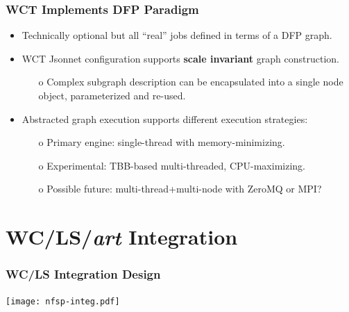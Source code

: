 \documentclass[xcolor=dvipsnames]{beamer}
\begin{document}
\begin{frame}
  \frametitle{WCT Implements DFP Paradigm}
  \begin{itemize}\footnotesize
  \item Technically optional but all ``real'' jobs defined in terms of a DFP graph.
  \item WCT Jsonnet configuration supports \textbf{scale invariant} graph construction.
    \begin{itemize}\scriptsize
    \item[o] Complex subgraph description can be encapsulated into a single node object, parameterized and re-used.
    \end{itemize}

  \item Abstracted graph execution supports different execution strategies:
    \begin{itemize}\scriptsize
    \item[o] Primary engine: single-thread with memory-minimizing.
    \item[o] Experimental: TBB-based multi-threaded, CPU-maximizing.
    \item[o] Possible future: multi-thread+multi-node with ZeroMQ or MPI?
    \end{itemize}
  \end{itemize}
  
\end{frame}

\section{WC/LS/\textit{art} Integration}
\begin{frame}
\end{frame}

\begin{frame}
  \frametitle{WC/LS Integration Design}
  \begin{center}
    \texttt{[image: nfsp-integ.pdf]}
  \end{center}
\end{frame}
\end{document}
